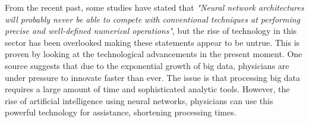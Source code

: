 \documentclass{article}
\begin{document}
From the recent past, some studies have stated that \textit{"Neural network architectures will probably never be able to compete with conventional techniques at performing precise and well-defined numerical operations"}\cite{widrow1994neural}, but the rise of technology in this sector has been overlooked making these statements appear to be untrue. This is proven by looking at the technological advancements in the present moment. One source suggests that due to the exponential growth of big data, physicians are under pressure to innovate faster than ever.\cite{2865174720180201} The issue is that processing big data requires a large amount of time and sophisticated analytic tools. However, the rise of artificial intelligence using neural networks, physicians can use this powerful technology for assistance, shortening processing times.
\end{document}
